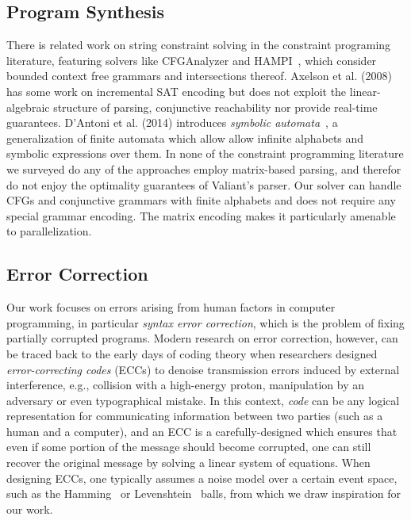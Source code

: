 \documentclass[sigplan,review,anonymous,acmsmall]{acmart}\settopmatter{printfolios=false,printccs=false,printacmref=false}
\begin{document}
\subsection{Program Synthesis}

There is related work on string constraint solving in the constraint programing literature, featuring solvers like CFGAnalyzer and HAMPI~\cite{kiezun2009hampi}, which consider bounded context free grammars and intersections thereof. Axelson et al. (2008)~\cite{axelsson2008analyzing} has some work on incremental SAT encoding but does not exploit the linear-algebraic structure of parsing, conjunctive reachability nor provide real-time guarantees. D'Antoni et al. (2014) introduces \textit{symbolic automata}~\cite{dantoni2014minimization}, a generalization of finite automata which allow allow infinite alphabets and symbolic expressions over them. In none of the constraint programming literature we surveyed do any of the approaches employ matrix-based parsing, and therefor do not enjoy the optimality guarantees of Valiant's parser. Our solver can handle CFGs and conjunctive grammars with finite alphabets and does not require any special grammar encoding. The matrix encoding makes it particularly amenable to parallelization.

\subsection{Error Correction}

Our work focuses on errors arising from human factors in computer programming, in particular \textit{syntax error correction}, which is the problem of fixing partially corrupted programs. Modern research on error correction, however, can be traced back to the early days of coding theory when researchers designed \textit{error-correcting codes} (ECCs) to denoise transmission errors induced by external interference, e.g., collision with a high-energy proton, manipulation by an adversary or even typographical mistake. In this context, \textit{code} can be any logical representation for communicating information between two parties (such as a human and a computer), and an ECC is a carefully-designed which ensures that even if some portion of the message should become corrupted, one can still recover the original message by solving a linear system of equations. When designing ECCs, one typically assumes a noise model over a certain event space, such as the Hamming~\cite{titsias2017hamming, dong2023number} or Levenshtein~\cite{becerra2008learning, barlev2021levenshtein} balls, from which we draw inspiration for our work.
\end{document}
